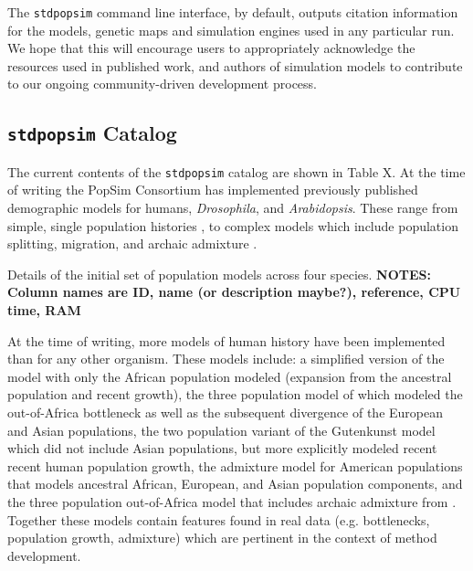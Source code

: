 \documentclass[12pt,halfline,a4paper]{ouparticle}
\newcommand{\stdpopsim}{\texttt{stdpopsim}\xspace}
\begin{document}
The \stdpopsim command line interface, by default, outputs citation information
for the models, genetic maps and simulation engines used in any particular run.
We hope that this will encourage users to appropriately acknowledge the
resources used in published work, and authors
of simulation models to contribute to our ongoing community-driven development process.

\subsection*{\texttt{stdpopsim} Catalog}
The current contents of the \texttt{stdpopsim} catalog are shown in Table X. At the time of
writing the PopSim Consortium has implemented previously published demographic models for
humans, \emph{Drosophila}, and \emph{Arabidopsis}. These range from
simple, single population histories \cite[e.g.,][]{sheehan2016deep},
to complex models which include population splitting, migration, and archaic
admixture \cite[e.g.,][]{ragsdale2019models}.

\begin{table}[t]
\begin{footnotesize}

\end{footnotesize}
\caption{\label{tab:catalog}
Details of the initial set of population models across four species.
\textbf{NOTES: Column names are ID, name (or description maybe?),
reference, CPU time, RAM}
}
\end{table}

At the time of writing, more models of human history have been implemented than for
any other organism. These models include: a simplified version of the \cite{tennessen2012evolution}
model with only the African population modeled (expansion from the ancestral
population and recent growth), the three population model of \cite{gutenkunst2009inferring}
which modeled the out-of-Africa bottleneck as well as the subsequent divergence of
the European and Asian populations, the \cite{tennessen2012evolution} two population variant of the
Gutenkunst model which did not include Asian populations, but more explicitly modeled
recent recent human population growth, the \cite{browning2018ancestry} admixture model
for American populations that models ancestral African, European, and Asian population
components, and the three population out-of-Africa model that includes archaic admixture
from \cite{ragsdale2019models}. Together these models
contain features found in real data (e.g. bottlenecks, population growth,
admixture) which are pertinent in the context of method development.
\end{document}

